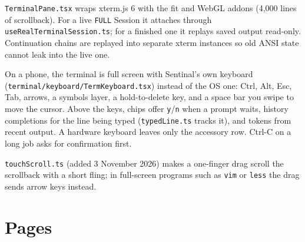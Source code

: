 \texttt{TerminalPane.\allowbreak{}tsx} wraps xterm.js 6 with the fit and WebGL addons (4,000 lines of scrollback). For a live \texttt{FULL} Session it attaches through \texttt{useRealTerminalSession.\allowbreak{}ts}; for a finished one it replays saved output read-only. Continuation chains are replayed into separate xterm instances so old ANSI state cannot leak into the live one.

On a phone, the terminal is full screen with Sentinal's own keyboard (\texttt{terminal/\allowbreak{}keyboard/\allowbreak{}TermKeyboard.\allowbreak{}tsx}) instead of the OS one: Ctrl, Alt, Esc, Tab, arrows, a symbols layer, a hold-to-delete key, and a space bar you swipe to move the cursor. Above the keys, chips offer \texttt{y}/\texttt{n} when a prompt waits, history completions for the line being typed (\texttt{typedLine.\allowbreak{}ts} tracks it), and tokens from recent output. A hardware keyboard leaves only the accessory row. Ctrl-C on a long job asks for confirmation first.

\texttt{touchScroll.\allowbreak{}ts} (added 3 November 2026) makes a one-finger drag scroll the scrollback with a short fling; in full-screen programs such as \texttt{vim} or \texttt{less} the drag sends arrow keys instead.

\section{\texorpdfstring{Pages}{Pages}}

